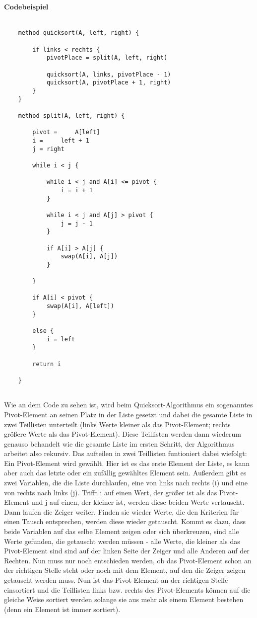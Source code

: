 \documentclass{article}
\begin{document}
	\paragraph{Codebeispiel}
	\begin{lstlisting}[caption=Der Quicksort-Algorithmus in einfachem Pseudocode]
	
	method quicksort(A, left, right) {
	
		if links < rechts {
			pivotPlace = split(A, left, right)
			
			quicksort(A, links, pivotPlace - 1)
			quicksort(A, pivotPlace + 1, right)
		}
	}
	
	method split(A, left, right) {
		
		pivot = 	A[left]
		i = 	left + 1
		j = right
		
		while i < j {
			
			while i < j and A[i] <= pivot {
				i = i + 1
			}
			
			while i < j and A[j] > pivot {
				j = j - 1
			}
			
			if A[i] > A[j] {
				swap(A[i], A[j])			
			}
					
		}
		
		if A[i] < pivot {
			swap(A[i], A[left])
		}
		
		else {
			i = left		
		}
		
		return i
		
	}
	
	\end{lstlisting}
	
	Wie an dem Code zu sehen ist, wird beim Quicksort-Algorithmus ein sogenanntes Pivot-Element an seinen Platz in der Liste gesetzt und dabei die gesamte Liste in zwei Teillisten unterteilt (links Werte kleiner als das Pivot-Element; rechts größere Werte als das Pivot-Element). Diese Teillisten werden dann wiederum genauso behandelt wie die gesamte Liste im ersten Schritt, der Algorithmus arbeitet also rekursiv. Das aufteilen in zwei Teillisten funtioniert dabei wiefolgt: Ein Pivot-Element wird gewählt. Hier ist es das erste Element der Liste, es kann aber auch das letzte oder ein zufällig gewähltes Element sein. Außerdem gibt es zwei Variablen, die die Liste durchlaufen, eine von links nach rechts (i) und eine von rechts nach links (j). Trifft i auf einen Wert, der größer ist als das Pivot-Element und j auf einen, der kleiner ist, werden diese beiden Werte vertauscht. Dann laufen die Zeiger weiter. Finden sie wieder Werte, die den Kriterien für einen Tausch entsprechen, werden diese wieder getauscht. Kommt es dazu, dass beide Variablen auf das selbe Element zeigen oder sich überkreuzen, sind alle Werte gefunden, die getauscht werden müssen - alle Werte, die kleiner als das Pivot-Element sind sind auf der linken Seite der Zeiger und alle Anderen auf der Rechten. Nun muss nur noch entschieden werden, ob das Pivot-Element schon an der richtigen Stelle steht oder noch mit dem Element, auf den die Zeiger zeigen getauscht werden muss. Nun ist das Pivot-Element an der richtigen Stelle einsortiert und die Teillisten links bzw. rechts des Pivot-Elements können auf die gleiche Weise sortiert werden solange sie aus mehr als einem Element bestehen (denn ein Element ist immer sortiert). 
	
\end{document}
